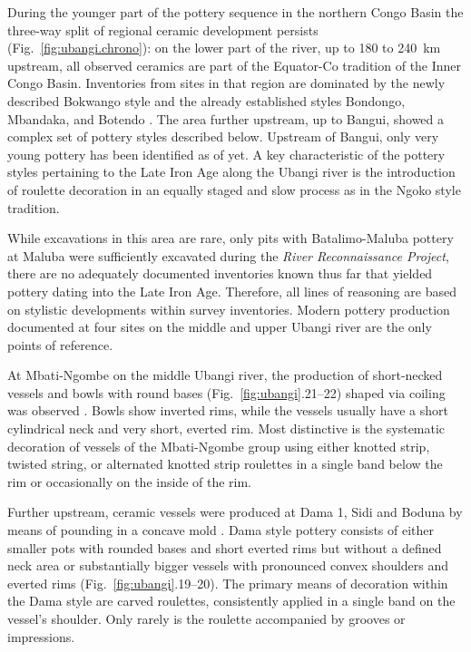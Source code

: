\documentclass[smallextended,natbib]{svjour3}       %
\begin{document}
During the younger part of the pottery sequence in the northern Congo Basin the three-way split of regional ceramic development persists (Fig.~\ref{fig:ubangi.chrono}): on the lower part of the river, up to 180 to 240~km upstream, all observed ceramics are part of the Equator-Co tradition of the Inner Congo Basin. Inventories from sites in that region are dominated by the newly described Bokwango style and the already established styles Bondongo, Mbandaka, and Botendo \citep[96--98, 172--181]{Seidensticker.2021e}. The area further upstream, up to Bangui, showed a complex set of pottery styles described below. Upstream of Bangui, only very young pottery has been identified as of yet. A key characteristic of the pottery styles pertaining to the Late Iron Age along the Ubangi river is the introduction of roulette decoration in an equally staged and slow process as in the Ngoko style tradition. 

While excavations in this area are rare, only pits with Batalimo-Maluba pottery at Maluba were sufficiently excavated during the \textit{River Reconnaissance Project}, there are no adequately documented inventories known thus far that yielded pottery dating into the Late Iron Age. Therefore, all lines of reasoning are based on stylistic developments within survey inventories. Modern pottery production documented at four sites on the middle and upper Ubangi river are the only points of reference.

At Mbati-Ngombe on the middle Ubangi river, the production of short-necked vessels and bowls with round bases (Fig.~\ref{fig:ubangi}.21--22) shaped via coiling was observed \citep[109--121]{Seidensticker.2021e}. Bowls show inverted rims, while the vessels usually have a short cylindrical neck and very short, everted rim. Most distinctive is the systematic decoration of vessels of the Mbati-Ngombe group using either knotted strip, twisted string, or alternated knotted strip roulettes \citep[88--105]{LivingstoneSmith.2010b} in a single band below the rim or occasionally on the inside of the rim.

Further upstream, ceramic vessels were produced at Dama 1, Sidi and Boduna by means of pounding in a concave mold \citep[69 Ftn.~101]{Seidensticker.2021e}. Dama style pottery \citep[104--109]{Seidensticker.2021e} consists of either smaller pots with rounded bases and short everted rims but without a defined neck area or substantially bigger vessels with pronounced convex shoulders and everted rims (Fig.~\ref{fig:ubangi}.19--20). The primary means of decoration within the Dama style are carved roulettes, consistently applied in a single band on the vessel’s shoulder. Only rarely is the roulette accompanied by grooves or impressions.
\end{document}
